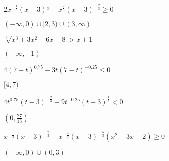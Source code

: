 \documentclass{ximera}
\begin{document}
\begin{question}
$2x^{-\frac{1}{3}}(x-3)^{\frac{1}{3}} + x^{\frac{2}{3}} (x-3)^{-\frac{2}{3}} \geq 0$
\begin{solution}
$(-\infty, 0) \cup [2,3) \cup (3, \infty)$
\end{solution}

\end{question}

\begin{question}
$\sqrt[3]{x^{3} + 3x^{2} - 6x - 8} > x + 1$ 


\begin{solution}
$(-\infty, -1)$  


\end{solution}

\end{question}

\begin{question}
$4(7-t)^{0.75} - 3t(7-t)^{-0.25} \leq 0$   %
\begin{solution}
$[4,7)$  
\end{solution}

\end{question}

\begin{question}
$4t^{0.75}(t - 3)^{-\frac{2}{3}} +9t^{-0.25}(t - 3)^{\frac{1}{3}} < 0$

\begin{solution}
$\left(0, \frac{27}{13} \right)$

\end{solution}

\end{question}

\begin{question}
$x^{-\frac{1}{3}} (x-3)^{-\frac{2}{3}} - x^{-\frac{4}{3}} (x-3)^{-\frac{5}{3}} (x^2-3x+2) \geq 0$  
\begin{solution}
$(-\infty, 0) \cup (0,3)$   \vphantom{$(-\infty, -4) \cup \left(-4, -\frac{22}{19}\right] \cup (2, \infty)$}
\end{solution}

\end{question}
\end{document}
